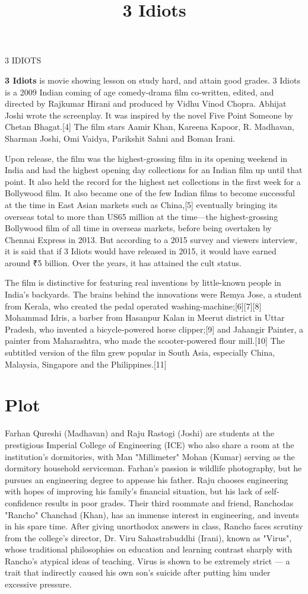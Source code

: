 \documentclass{Article}
\title{3 Idiots}
\begin{document}
\begin{center} \LARGE 3 IDIOTS
\end{center}
\vsapce{8mm}
\Large{
\begin{center}\textbf{3 Idiots} is movie showing lesson on study hard, and attain good grades. 3 Idiots is a 2009 Indian coming of age comedy-drama film co-written, edited, and directed by Rajkumar Hirani and produced by Vidhu Vinod Chopra. Abhijat Joshi wrote the screenplay. It was inspired by the novel Five Point Someone by Chetan Bhagat.[4] The film stars Aamir Khan, Kareena Kapoor, R. Madhavan, Sharman Joshi, Omi Vaidya, Parikshit Sahni and Boman Irani.

Upon release, the film was the highest-grossing film in its opening weekend in India and had the highest opening day collections for an Indian film up until that point. It also held the record for the highest net collections in the first week for a Bollywood film. It also became one of the few Indian films to become successful at the time in East Asian markets such as China,[5] eventually bringing its overseas total to more than US65 million at the time—the highest-grossing Bollywood film of all time in overseas markets, before being overtaken by Chennai Express in 2013. But according to a 2015 survey and viewers interview, it is said that if 3 Idiots would have released in 2015, it would have earned around ₹5 billion. Over the years, it has attained the cult status.

The film is distinctive for featuring real inventions by little-known people in India's backyards. The brains behind the innovations were Remya Jose, a student from Kerala, who created the pedal operated washing-machine;[6][7][8] Mohammad Idris, a barber from Hasanpur Kalan in Meerut district in Uttar Pradesh, who invented a bicycle-powered horse clipper;[9] and Jahangir Painter, a painter from Maharashtra, who made the scooter-powered flour mill.[10] The subtitled version of the film grew popular in South Asia, especially China, Malaysia, Singapore and the Philippines.[11] \end{center}}
\section{Plot}
Farhan Qureshi (Madhavan) and Raju Rastogi (Joshi) are students at the prestigious Imperial College of Engineering (ICE) who also share a room at the institution's dormitories, with Man "Millimeter" Mohan (Kumar) serving as the dormitory household serviceman. Farhan's passion is wildlife photography, but he pursues an engineering degree to appease his father. Raju chooses engineering with hopes of improving his family's financial situation, but his lack of self-confidence results in poor grades. Their third roommate and friend, Ranchodas "Rancho" Chanchad (Khan), has an immense interest in engineering, and invents in his spare time. After giving unorthodox answers in class, Rancho faces scrutiny from the college's director, Dr. Viru Sahastrabuddhi (Irani), known as "Virus", whose traditional philosophies on education and learning contrast sharply with Rancho's atypical ideas of teaching. Virus is shown to be extremely strict — a trait that indirectly caused his own son's suicide after putting him under excessive pressure.
\end{document}
